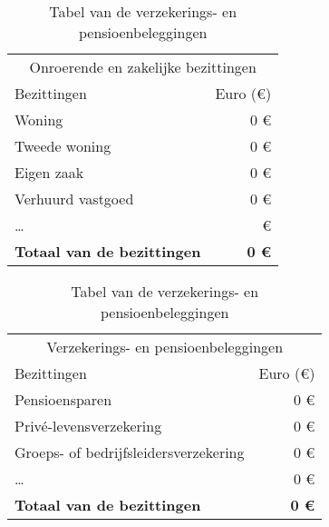 \begin{table}[ht]
	\begin{minipage}[b]{9cm}\centering
		\begin{tabular}{@{}lr@{}}
			\toprule
			\multicolumn{2}{c}{Onroerende en zakelijke bezittingen}  \\
			\cmidrule(r){1-2}
			Bezittingen &        Euro (\euro{}) \\ \midrule
			Woning                           &             0 \euro{} \\
			Tweede woning                    &             0 \euro{} \\
			Eigen zaak                       &             0 \euro{} \\
			Verhuurd vastgoed                &             0 \euro{} \\
			\dots                            &               \euro{} \\ \toprule
			\textbf{Totaal van de bezittingen} & \textbf{0 \euro{}} \\ \bottomrule
		\end{tabular}
		\caption{Tabel van de onroerende en zakelijke bezittingen}
		\label{tab:tabelonroerendeenzakelijkebezittingen}
		
		
	\end{minipage}
	\hspace{0.5cm}
	\begin{minipage}[b]{9cm}\centering
		\begin{tabular}{@{}lr@{}}
			\toprule
			 \multicolumn{2}{c}{Verzekerings- en pensioenbeleggingen}   \\
			\cmidrule(r){1-2}
			Bezittingen      &      Euro (\euro{}) \\ \midrule
			Pensioensparen                        &           0 \euro{} \\
			Privé-levensverzekering               &           0 \euro{} \\
			Groeps- of bedrijfsleidersverzekering &           0 \euro{} \\
			\dots                                 &          0 \euro{} \\ \toprule
			\textbf{Totaal van de bezittingen}    & \textbf{0 \euro{}} \\ \bottomrule
		\end{tabular}
		\caption{Tabel van de verzekerings- en pensioenbeleggingen}
		\label{tab:tabelverzekeringsenpensioenbeleggingen}
	\end{minipage}
\end{table}

